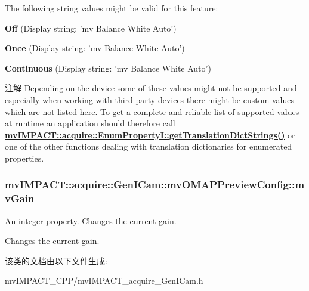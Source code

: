 The following string values might be valid for this feature\+:
\begin{DoxyItemize}
\item {\bfseries Off} (Display string\+: 'mv Balance White Auto')
\item {\bfseries Once} (Display string\+: 'mv Balance White Auto')
\item {\bfseries Continuous} (Display string\+: 'mv Balance White Auto')
\end{DoxyItemize}

\begin{DoxyNote}{注解}
Depending on the device some of these values might not be supported and especially when working with third party devices there might be custom values which are not listed here. To get a complete and reliable list of supported values at runtime an application should therefore call {\bfseries \hyperlink{classmv_i_m_p_a_c_t_1_1acquire_1_1_enum_property_i_a0ba6ccbf5ee69784d5d0b537924d26b6}{mv\+I\+M\+P\+A\+C\+T\+::acquire\+::\+Enum\+Property\+I\+::get\+Translation\+Dict\+Strings()}} or one of the other functions dealing with translation dictionaries for enumerated properties. 
\end{DoxyNote}
\hypertarget{classmv_i_m_p_a_c_t_1_1acquire_1_1_gen_i_cam_1_1mv_o_m_a_p_preview_config_a6268ed5e73fa21da472e43b50d897b78}{
\subsubsection[{mv\+Gain}]{ mv\+I\+M\+P\+A\+C\+T\+::acquire\+::\+Gen\+I\+Cam\+::mv\+O\+M\+A\+P\+Preview\+Config\+::mv\+Gain}}\label{classmv_i_m_p_a_c_t_1_1acquire_1_1_gen_i_cam_1_1mv_o_m_a_p_preview_config_a6268ed5e73fa21da472e43b50d897b78}


An integer property. Changes the current gain. 

Changes the current gain. 

该类的文档由以下文件生成\+:\begin{DoxyCompactItemize}
\item 
mv\+I\+M\+P\+A\+C\+T\+\_\+\+C\+P\+P/mv\+I\+M\+P\+A\+C\+T\+\_\+acquire\+\_\+\+Gen\+I\+Cam.\+h\end{DoxyCompactItemize}
